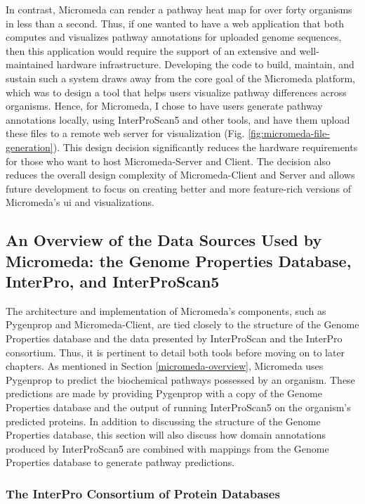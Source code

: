 In contrast, Micromeda can render a pathway heat map for over forty organisms in 
less than a second. Thus, if one wanted to have a web application that both 
computes and visualizes pathway annotations for uploaded genome sequences, then 
this application would require the support of an extensive and well-maintained 
hardware infrastructure. Developing the code to build, maintain, and sustain 
such a system draws away from the core goal of the Micromeda platform, which was 
to design a tool that helps users visualize pathway differences across 
organisms. Hence, for Micromeda, I chose to have users generate pathway 
annotations locally, using InterProScan5 and other tools, and have them upload 
these files to a remote web server for visualization (Fig. 
\ref{fig:micromeda-file-generation}). This design decision significantly reduces 
the hardware requirements for those who want to host Micromeda-Server and 
Client. The decision also reduces the overall design complexity of 
Micromeda-Client and Server and allows future development to focus on creating 
better and more feature-rich versions of Micromeda's \gls{ui} and 
visualizations.

\subsection{An Overview of the Data Sources Used by Micromeda: the Genome 
Properties Database, InterPro, and InterProScan5} \label{micromeda-data-sources} 

The architecture and implementation of Micromeda's components, such as Pygenprop 
and Micromeda-Client, are tied closely to the structure of the Genome Properties 
database and the data presented by InterProScan and the InterPro consortium. 
Thus, it is pertinent to detail both tools before moving on to later chapters. 
As mentioned in Section \ref{micromeda-overview}, Micromeda uses Pygenprop to 
predict the biochemical pathways possessed by an organism. These predictions are 
made by providing Pygenprop with a copy of the Genome Properties database and 
the output of running InterProScan5 on the organism's predicted proteins. In 
addition to discussing the structure of the Genome Properties database, this 
section will also discuss how domain annotations produced by InterProScan5 are 
combined with mappings from the Genome Properties database to generate pathway 
predictions.

\subsubsection{The InterPro Consortium of Protein Databases} 

